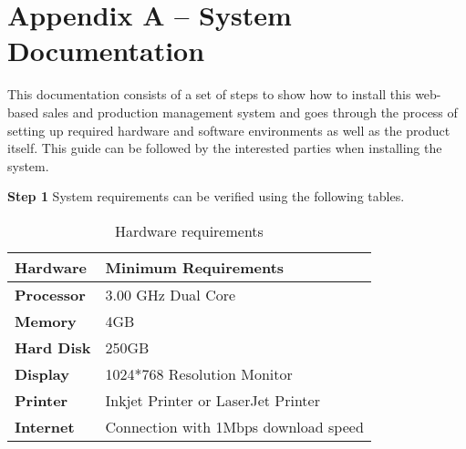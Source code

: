 \documentclass[12pt]{report}
\begin{document}

\newpage
{}
\singlespacing
\printbibliography[title={References}]


\renewcommand\thechapter{\Alph{chapter}}
\renewcommand\thesection{\thechapter.\arabic{section}}

\setcounter{chapter}{1}
\setcounter{section}{0}
\setcounter{figure}{0}
\chapter*{Appendix A – System Documentation}
This documentation consists of a set of steps to show how to install this web-based sales and production management system and goes through the process of setting up required hardware and software environments as well as the product itself. This guide can be followed by the interested parties when installing the system.

\noindent
\large{\bf{Step 1}}\newline
System requirements can be verified using the following tables.

\begin{table}[H]
	\centering
	\begin{tabular}{ | p{2.5cm} | p{8.5cm} |}
		\hline
		\bf{Hardware}  & \bf{Minimum Requirements}            \\
		\hline
		\bf{Processor} & 3.00 GHz Dual Core                   \\
		\hline
		\bf{Memory}    & 4GB                                  \\
		\hline
		\bf{Hard Disk} & 250GB                                \\
		\hline
		\bf{Display}   & 1024*768 Resolution Monitor          \\
		\hline
		\bf{Printer}   & Inkjet Printer or LaserJet Printer   \\
		\hline
		\bf{Internet}  & Connection with 1Mbps download speed \\
		\hline
	\end{tabular}
	\caption{Hardware requirements}
\end{table}
\end{document}
